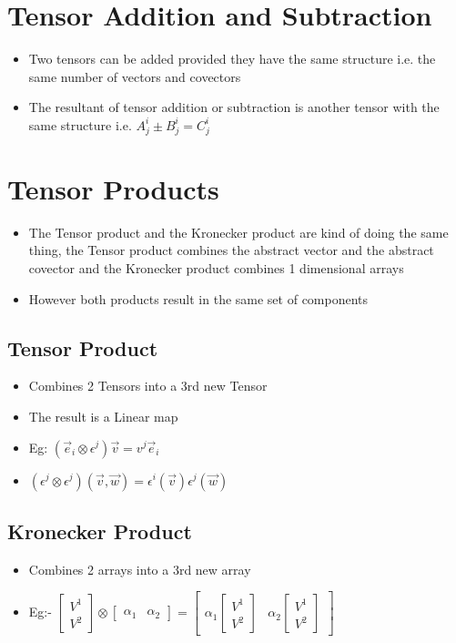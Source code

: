 \section{Tensor Addition and Subtraction}
\begin{itemize}
\item Two tensors can be added provided they have the same structure i.e. the same number of vectors and covectors
\item The resultant of tensor addition or subtraction is another tensor with the same structure i.e. $A^{i}_{j} \pm B^{i}_{j} = C^{i}_{j}$
\end{itemize}

\section{Tensor Products}
\begin{itemize}
	\item The Tensor product and the Kronecker product are kind of doing the same thing, the Tensor product combines the abstract vector and the abstract covector and the Kronecker product combines 1 dimensional arrays
	\item However both products result in the same set of components
\end{itemize}
\subsection{Tensor Product}
\begin{itemize}
\item Combines 2 Tensors into a 3rd new Tensor
\item The result is a Linear map
\item Eg: $(\vec{e}_{i} \otimes \epsilon^{j})\vec{v} = v^{j}\vec{e}_{i}$
\item $(\epsilon^{j} \otimes \epsilon^{j})(\vec{v}, \vec{w}) = \epsilon^{i}(\vec{v})\epsilon^{j}(\vec{w})$
\end{itemize}
\subsection{Kronecker Product}
\begin{itemize}
\item Combines 2 arrays into a 3rd new array
\item Eg:-  $\begin{bmatrix}V^{1} \\
V^{2} \end{bmatrix} \otimes \begin{bmatrix}\alpha_{1} &
\alpha_{2} \end{bmatrix} = \begin{bmatrix}
\alpha_{1} \begin{bmatrix}V^{1} \\
V^{2} \end{bmatrix} & \alpha_{2} \begin{bmatrix}V^{1} \\
V^{2} \end{bmatrix}
\end{bmatrix}$
\end{itemize}

